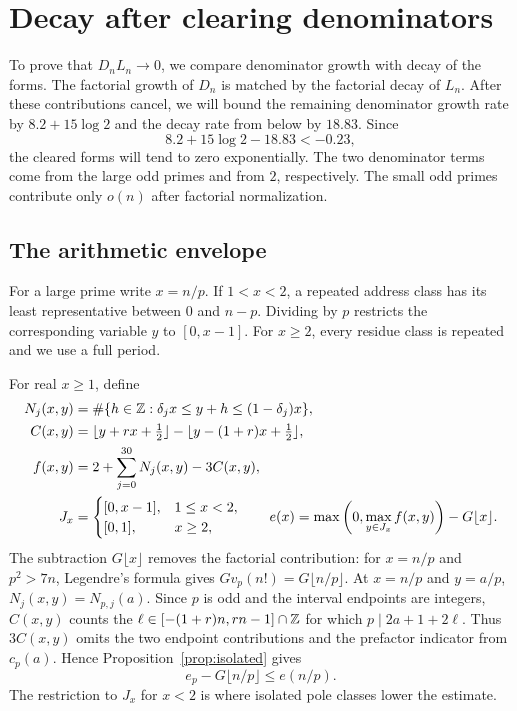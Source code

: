\section{Decay after clearing denominators}\label{sec:decay}
To prove that $D_nL_n\to0$, we compare denominator growth with decay
of the forms. The factorial growth of $D_n$ is matched by the factorial
decay of $L_n$. After these contributions cancel, we will bound the
remaining denominator growth rate by $8.2+15\log2$ and the decay rate
from below by $18.83$. Since
\[
 8.2+15\log2-18.83<-0.23,
\]
the cleared forms will tend to zero exponentially. The two denominator
terms come from the large odd primes and from $2$, respectively.
The small odd primes contribute only $o(n)$ after factorial normalization.

\subsection{The arithmetic envelope}
For a large prime write $x=n/p$. If $1<x<2$, a repeated address
class has its least representative between $0$ and $n-p$. Dividing
by $p$ restricts the corresponding variable $y$ to $[0,x-1]$.
For $x\ge2$, every residue class is repeated and we use a full period.

For real $x\ge1$, define
\begin{align*}
 N_j(x,y)&=\#\{h\in\mathbb Z:\delta_jx\le y+h\le(1-\delta_j)x\},\\
 C(x,y)&=\lfloor y+rx+\tfrac12\rfloor
                         -\lfloor y-(1+r)x+\tfrac12\rfloor,\\
 f(x,y)&=2+\sum_{j=0}^{30}N_j(x,y)-3C(x,y),\\
 J_x&=\begin{cases}[0,x-1],&1\le x<2,\\ {}[0,1],&x\ge2,\end{cases}
 \qquad
 e(x)=\max\left(0,\max_{y\in J_x}f(x,y)\right)-G\lfloor x\rfloor.
\end{align*}
The subtraction $G\lfloor x\rfloor$ removes the factorial contribution:
for $x=n/p$ and $p^2>7n$, Legendre's formula gives
$Gv_p(n!)=G\lfloor n/p\rfloor$.
At $x=n/p$ and $y=a/p$, $N_j(x,y)=N_{p,j}(a)$. Since $p$ is odd
and the interval endpoints are integers, $C(x,y)$ counts the
$\ell\in[-(1+r)n,rn-1]\cap\mathbb Z$ for which $p\mid2a+1+2\ell$.
Thus $3C(x,y)$ omits the two endpoint contributions and the prefactor indicator
from $c_p(a)$. Hence
Proposition~\ref{prop:isolated} gives
\begin{equation}\label{eq:prime-envelope}
 e_p-G\lfloor n/p\rfloor\le e(n/p).
\end{equation}
The restriction to $J_x$ for $x<2$ is where isolated pole classes
lower the estimate.

